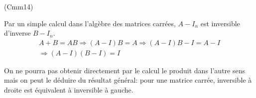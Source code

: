 \begin{tiny}(Cmm14)\end{tiny} Par un simple calcul dans l'algèbre des matrices carrées, $A-I_n$ est inversible d'inverse 
$B-I_n$. 
\begin{multline*}
  A+B = AB \Rightarrow (A-I)B=A \Rightarrow (A-I)B -I = A-I \\
  \Rightarrow (A-I)(B-I) = I
\end{multline*}

On ne pourra pas obtenir directement par le calcul le produit dans l'autre sens mais on peut le déduire du résultat général: pour une matrice carrée, inversible à droite est équivalent à inversible à gauche.
